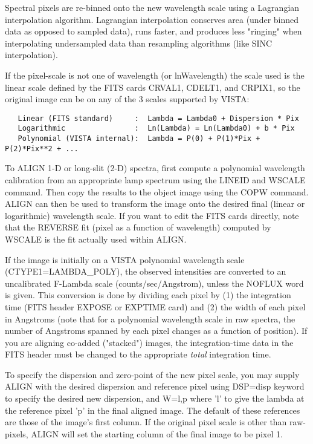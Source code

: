 Spectral pixels are re-binned onto the new wavelength scale using a
Lagrangian interpolation algorithm.  Lagrangian interpolation conserves
area (under binned data as opposed to sampled data), runs faster, and
produces less "ringing" when interpolating undersampled data than
resampling algorithms (like SINC interpolation).
 
If the pixel-scale is not one of wavelength (or ln{Wavelength}) the scale
used is the linear scale defined by the FITS cards CRVAL1, CDELT1, and
CRPIX1, so the original image can be on any of the 3 scales supported by
VISTA:
\begin{verbatim}
   Linear (FITS standard)     :  Lambda = Lambda0 + Dispersion * Pix
   Logarithmic                :  Ln(Lambda) = Ln(Lambda0) + b * Pix
   Polynomial (VISTA internal):  Lambda = P(0) + P(1)*Pix + P(2)*Pix**2 + ...
\end{verbatim} 

To ALIGN 1-D or long-slit (2-D) spectra, first compute a polynomial
wavelength calibration from an appropriate lamp spectrum using the LINEID
and WSCALE command.  Then copy the results to the object image using the
COPW command.  ALIGN can then be used to transform the image onto the
desired final (linear or logarithmic) wavelength scale. If you want to
edit the FITS cards directly, note that the REVERSE fit (pixel as a
function of wavelength) computed by WSCALE is the fit actually used within
ALIGN.
 
If the image is initially on a VISTA polynomial wavelength scale
(CTYPE1=LAMBDA\_POLY), the observed intensities are converted to an
uncalibrated F-Lambda scale (counts/sec/Angstrom), unless the NOFLUX word
is given. This conversion is done by dividing each pixel by (1) the
integration time (FITS header EXPOSE or EXPTIME card) and (2) the width of
each pixel in Angstroms (note that for a polynomial wavelength scale in raw
spectra, the number of Angstroms spanned by each pixel changes as a
function of position).  If you are aligning co-added ("stacked") images,
the integration-time data in the FITS header must be changed to the
appropriate \textit{total} integration time.

To specify the dispersion and zero-point of the new pixel scale, you may
supply ALIGN with the desired dispersion and reference pixel using DSP=disp
keyword to specify the desired new dispersion, and W=l,p where 'l' to give
the lambda at the reference pixel 'p' in the final aligned image. The
default of these references are those of the image's first column. If the
original pixel scale is other than raw-pixels, ALIGN will set the starting
column of the final image to be pixel 1.
 
